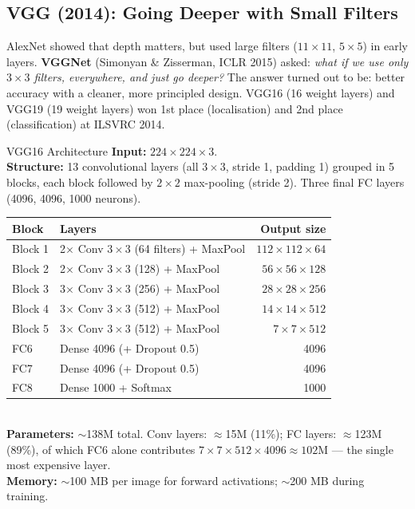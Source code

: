 \documentclass[11pt,a4paper]{article}
\newcommand{\term}[1]{\textcolor{DefGreen}{\textbf{#1}}\index{#1}}
\begin{document}
\subsection{VGG (2014): Going Deeper with Small Filters}
\label{sec:vgg}

AlexNet showed that depth matters, but used large filters ($11\times11$, $5\times5$) in early layers.
\term{VGGNet} (Simonyan \& Zisserman, ICLR 2015) asked: \emph{what if we use \emph{only} $3\times3$
filters, everywhere, and just go deeper?}  The answer turned out to be: better accuracy with a
cleaner, more principled design.  VGG16 (16 weight layers) and VGG19 (19 weight layers) won 1st
place (localisation) and 2nd place (classification) at ILSVRC 2014.

\begin{defbox}{VGG16 Architecture}
\textbf{Input:} $224\times224\times3$.\\
\textbf{Structure:} 13 convolutional layers (all $3\times3$, stride 1, padding 1) grouped in 5
blocks, each block followed by $2\times2$ max-pooling (stride 2).  Three final FC layers (4096,
4096, 1000 neurons).\\[4pt]
\begin{tabular}{@{}llr@{}}
\toprule
\textbf{Block} & \textbf{Layers} & \textbf{Output size} \\
\midrule
Block 1 & 2$\times$ Conv $3\times3$ (64 filters) + MaxPool & $112\times112\times64$ \\
Block 2 & 2$\times$ Conv $3\times3$ (128) + MaxPool & $56\times56\times128$ \\
Block 3 & 3$\times$ Conv $3\times3$ (256) + MaxPool & $28\times28\times256$ \\
Block 4 & 3$\times$ Conv $3\times3$ (512) + MaxPool & $14\times14\times512$ \\
Block 5 & 3$\times$ Conv $3\times3$ (512) + MaxPool & $7\times7\times512$ \\
FC6     & Dense 4096 (+ Dropout 0.5)                & 4096 \\
FC7     & Dense 4096 (+ Dropout 0.5)                & 4096 \\
FC8     & Dense 1000 + Softmax                      & 1000 \\
\bottomrule
\end{tabular}\\[6pt]
\textbf{Parameters:} $\sim$138M total.  Conv layers: $\approx$15M (11\%); FC layers: $\approx$123M
(89\%), of which FC6 alone contributes $7\times7\times512\times4096 \approx 102\text{M}$ — the
single most expensive layer.\\
\textbf{Memory:} $\sim$100 MB per image for forward activations; $\sim$200 MB during training.
\end{defbox}
\end{document}
